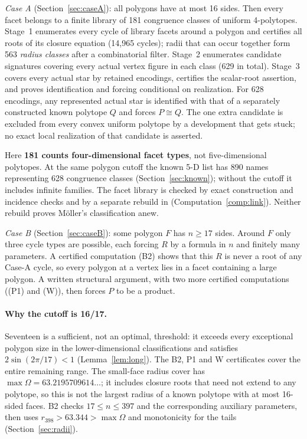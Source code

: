 \documentclass[11pt]{article}
\theoremstyle{definition}
\theoremstyle{remark}
\newcommand{\file}[1]{\path{#1}}
\begin{document}
\emph{Case A} (Section~\ref{sec:caseA}): all polygons have at most 16
sides. Then every facet belongs to a finite library of 181 congruence
classes of uniform 4-polytopes. Stage~1 enumerates every cycle of library
facets around a polygon and certifies all roots of its closure equation
(14,965 cycles); radii that can occur together form 563 \emph{radius
classes} after a combinatorial filter. Stage~2 enumerates candidate
signatures covering every actual vertex figure in each class (629 in
total). Stage~3 covers every actual star by retained encodings, certifies
the scalar-root assertion, and proves identification and forcing
conditional on realization. For 628 encodings, any represented actual
star is identified with that of a separately constructed known polytope
$Q$ and forces $P\cong Q$. The one extra candidate is excluded from every
convex uniform polytope by a development that gets stuck; no exact local
realization of that candidate is asserted.

Here \textbf{181 counts four-dimensional facet types}, not
five-dimensional polytopes. At the same polygon cutoff the known 5-D
list has 890 names representing 628 congruence classes
(Section~\ref{sec:known}); without the cutoff it includes infinite
families. The facet library is checked by exact construction and incidence
checks and by a separate rebuild in \file{checks/independent-s1-b2/}
(Computation~\ref{comp:link}). Neither rebuild proves Möller's
classification anew.

\emph{Case B} (Section~\ref{sec:caseB}): some polygon $F$ has $n\ge17$
sides. Around $F$ only three cycle types are possible, each forcing $R$ by
a formula in $n$ and finitely many parameters. A certified computation
(B2) shows that this $R$ is never a root of any Case-A cycle, so every
polygon at a vertex lies in a facet containing a large polygon. A written
structural argument, with two more certified computations ((P1) and (W)),
then forces $P$ to be a product.

\paragraph{Why the cutoff is 16/17.}\label{par:cutoff}
Seventeen is a sufficient, not an optimal, threshold: it exceeds every
exceptional polygon size in the lower-dimensional classifications and
satisfies $2\sin(2\pi/17)<1$ (Lemma~\ref{lem:long}). The B2, P1 and W
certificates cover the entire remaining range. The small-face radius cover
has $\max\Omega=63.2195709614\ldots$; it includes closure roots that need
not extend to any polytope, so this is not the largest radius of a known
polytope with at most 16-sided faces. B2 checks $17\le n\le397$ and the
corresponding auxiliary parameters, then uses
$r_{398}>63.344>\max\Omega$ and monotonicity for the tails
(Section~\ref{sec:radii}).
\end{document}
